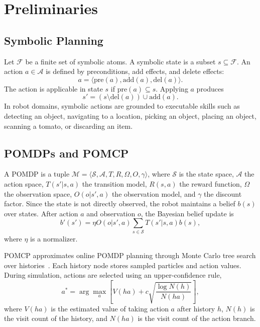 \section{Preliminaries}
\label{sec:preliminaries}

\subsection{Symbolic Planning}

Let $\mathcal{F}$ be a finite set of symbolic atoms. A symbolic state is a subset $s \subseteq \mathcal{F}$. An action $a \in \mathcal{A}$ is defined by preconditions, add effects, and delete effects:
\[
a = \langle \mathrm{pre}(a), \mathrm{add}(a), \mathrm{del}(a) \rangle .
\]
The action is applicable in state $s$ if $\mathrm{pre}(a) \subseteq s$. Applying $a$ produces
\[
s' = (s \setminus \mathrm{del}(a)) \cup \mathrm{add}(a).
\]
In robot domains, symbolic actions are grounded to executable skills such as detecting an object, navigating to a location, picking an object, placing an object, scanning a tomato, or discarding an item.

\subsection{POMDPs and POMCP}

A POMDP is a tuple $\mathcal{M}=\langle \mathcal{S},\mathcal{A},T,R,\Omega,O,\gamma\rangle$, where $\mathcal{S}$ is the state space, $\mathcal{A}$ the action space, $T(s'|s,a)$ the transition model, $R(s,a)$ the reward function, $\Omega$ the observation space, $O(o|s',a)$ the observation model, and $\gamma$ the discount factor. Since the state is not directly observed, the robot maintains a belief $b(s)$ over states. After action $a$ and observation $o$, the Bayesian belief update is
\begin{equation}
b'(s') = \eta O(o|s',a)\sum_{s \in \mathcal{S}}T(s'|s,a)b(s),
\label{eq:bayes}
\end{equation}
where $\eta$ is a normalizer.

POMCP approximates online POMDP planning through Monte Carlo tree search over histories~\cite{silver2010monte}. Each history node stores sampled particles and action values. During simulation, actions are selected using an upper-confidence rule,
\begin{equation}
a^* = \arg\max_a \left[V(ha) + c\sqrt{\frac{\log N(h)}{N(ha)}}\right],
\label{eq:ucb}
\end{equation}
where $V(ha)$ is the estimated value of taking action $a$ after history $h$, $N(h)$ is the visit count of the history, and $N(ha)$ is the visit count of the action branch.

